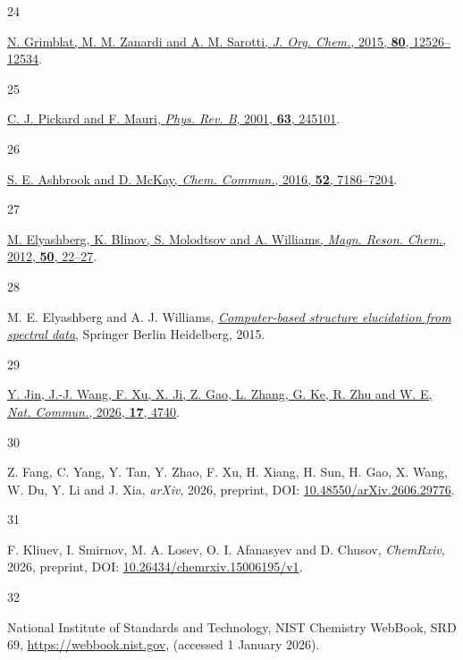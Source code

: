 \documentclass[
  10pt,
]{article}
\newlength{\cslhangindent}
\newlength{\csllabelwidth}
\newlength{\cslentryspacingunit} %
\newenvironment{CSLReferences}[2] %
 {%
  \setlength{\parindent}{0pt}
  \ifodd #1
  \let\oldpar\par
  \def\par{\hangindent=\cslhangindent\oldpar}
  \fi
  \setlength{\parskip}{#2\cslentryspacingunit}
 }%
 {}
\newcommand{\CSLLeftMargin}[1]{\parbox[t]{\csllabelwidth}{#1}}
\newcommand{\CSLRightInline}[1]{\parbox[t]{\linewidth - \csllabelwidth}{#1}\break}
\begin{document}
\begin{CSLReferences}{0}{0}
\leavevmode{}%
\CSLLeftMargin{24 }%
\CSLRightInline{\href{https://doi.org/10.1021/acs.joc.5b02396}{N.
Grimblat, M. M. Zanardi and A. M. Sarotti, \emph{J. Org. Chem.}, 2015,
\textbf{80}, 12526--12534}.}

\leavevmode{}%
\CSLLeftMargin{25 }%
\CSLRightInline{\href{https://doi.org/10.1103/PhysRevB.63.245101}{C. J.
Pickard and F. Mauri, \emph{Phys. Rev. B}, 2001, \textbf{63}, 245101}.}

\leavevmode{}%
\CSLLeftMargin{26 }%
\CSLRightInline{\href{https://doi.org/10.1039/c6cc02542k}{S. E. Ashbrook
and D. McKay, \emph{Chem. Commun.}, 2016, \textbf{52}, 7186--7204}.}

\leavevmode{}%
\CSLLeftMargin{27 }%
\CSLRightInline{\href{https://doi.org/10.1002/mrc.2849}{M. Elyashberg,
K. Blinov, S. Molodtsov and A. Williams, \emph{Magn. Reson. Chem.},
2012, \textbf{50}, 22--27}.}

\leavevmode{}%
\CSLLeftMargin{28 }%
\CSLRightInline{M. E. Elyashberg and A. J. Williams,
\emph{\href{https://doi.org/10.1007/978-3-662-46402-1}{Computer-based
structure elucidation from spectral data}}, Springer Berlin Heidelberg,
2015.}

\leavevmode{}%
\CSLLeftMargin{29 }%
\CSLRightInline{\href{https://doi.org/10.1038/s41467-026-71315-0}{Y.
Jin, J.-J. Wang, F. Xu, X. Ji, Z. Gao, L. Zhang, G. Ke, R. Zhu and W. E,
\emph{Nat. Commun.}, 2026, \textbf{17}, 4740}.}

\leavevmode{}%
\CSLLeftMargin{30 }%
\CSLRightInline{Z. Fang, C. Yang, Y. Tan, Y. Zhao, F. Xu, H. Xiang, H.
Sun, H. Gao, X. Wang, W. Du, Y. Li and J. Xia, \emph{arXiv}, 2026,
preprint, DOI:
\href{https://doi.org/10.48550/arXiv.2606.29776}{10.48550/arXiv.2606.29776}.}

\leavevmode{}%
\CSLLeftMargin{31 }%
\CSLRightInline{F. Kliuev, I. Smirnov, M. A. Losev, O. I. Afanasyev and
D. Chusov, \emph{ChemRxiv}, 2026, preprint, DOI:
\href{https://doi.org/10.26434/chemrxiv.15006195/v1}{10.26434/chemrxiv.15006195/v1}.}

\leavevmode{}%
\CSLLeftMargin{32 }%
\CSLRightInline{National Institute of Standards and Technology, NIST
Chemistry WebBook, SRD 69, \url{https://webbook.nist.gov}, (accessed 1
January 2026).}


\end{CSLReferences}
\end{document}
